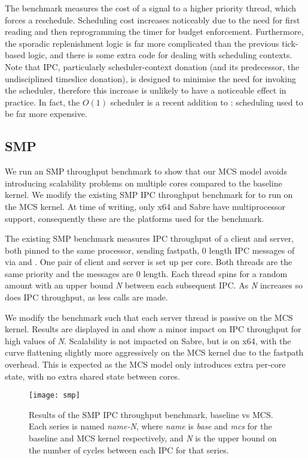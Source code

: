 The  benchmark measures the cost of a signal to a higher priority thread, which forces a reschedule.
Scheduling cost increases noticeably due to the need for first reading
and then reprogramming the timer for budget enforcement. Furthermore,
the sporadic replenishment logic is far more complicated than the
previous tick-based logic, and there is some extra code for
dealing with scheduling contexts. Note that \selfour IPC,
particularly scheduler-context donation (and its predecessor, the
undisciplined timeslice donation), is designed to minimise the need for
invoking the scheduler, therefore this increase is unlikely to have
a noticeable effect in practice. In fact, the \(O(1)\) scheduler is a
recent addition to \selfour: scheduling used to be far more expensive.



\subsection{SMP}

We run an SMP throughput benchmark to show that our MCS model
avoids introducing scalability problems on multiple cores compared to the baseline kernel.
We modify the
existing SMP IPC throughput benchmark for \selfour to run on the MCS kernel. 
At time of writing, only x64 and Sabre have \selfour multiprocessor support, 
consequently these are the platforms used for the benchmark.

The existing SMP benchmark measures IPC throughput of a client and server, both 
pinned to the same processor, sending fastpath, 0 length IPC messages of via \call
and \replyrecv. One pair of client and server is set up per core. Both threads are
the same priority and the messages are 0 length. Each thread spins for a random amount
with an upper bound \textit{N} between each subsequent IPC. As \textit{N} increases so does
IPC throughput, as less calls are made.

We modify the benchmark such that each server thread is passive on the MCS kernel.
Results are displayed in  and show a minor impact on IPC throughput
for high values of \textit{N}. Scalability is not impacted on Sabre, but is on x64,
with the curve flattening slightly more aggressively on the MCS kernel
due to the fastpath overhead. This is expected as the MCS model only introduces extra 
per-core state, with no extra shared state between cores.

\begin{figure}[ht] 
    \centering
    \texttt{[image: smp]}
    \caption{Results of the SMP IPC throughput benchmark, baseline \selfour vs MCS. 
        Each series is named \textit{name-N}, where \textit{name} is \textit{base} and \textit{mcs} for 
        the baseline and MCS kernel respectively, and \textit{N} is the upper
        bound on the number of cycles between each IPC for that series.}
    \label{f:evaluation-smp}
\end{figure}

